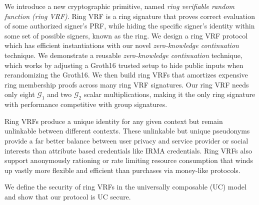 
\def\eprintsmallskip{\smallskip}{}%
We introduce a new cryptographic primitive,  named
 \emph{ring verifiable random function (ring VRF)}.
Ring VRF is a ring signature that proves correct evaluation
of some authorized signer's PRF, while hiding the specific signer's
identity within some set of possible signers, known as the ring. We design a ring VRF protocol which has efficient instantiations with our novel {\em zero-knowledge continuation} technique.
We demonstrate a reusable {\em zero-knowledge continuation} technique,
which works by adjusting a Groth16 trusted setup to hide public inputs
when rerandomizing the Groth16.  We then build ring VRFs that amortizes
expensive ring membership proofs across many ring VRF signatures.
%
Our ring VRF needs only eight $\mathcal{G}_1$ and two
$\mathcal{G}_2$ scalar multiplications, making it the only ring signature
with performance competitive with group signatures.

Ring VRFs produce a unique identity for any given context but remain
unlinkable between different contexts.  These unlinkable but unique
pseudonyms provide a far better balance between user privacy and service
provider or social interests than attribute based credentials like IRMA credentials.
Ring VRFs also support anonymously rationing or rate limiting resource
consumption that winds up vastly more flexible and efficient than
purchases via money-like protocols.

We define the security of ring VRFs in the universally composable (UC) model and show that our protocol is UC secure.
